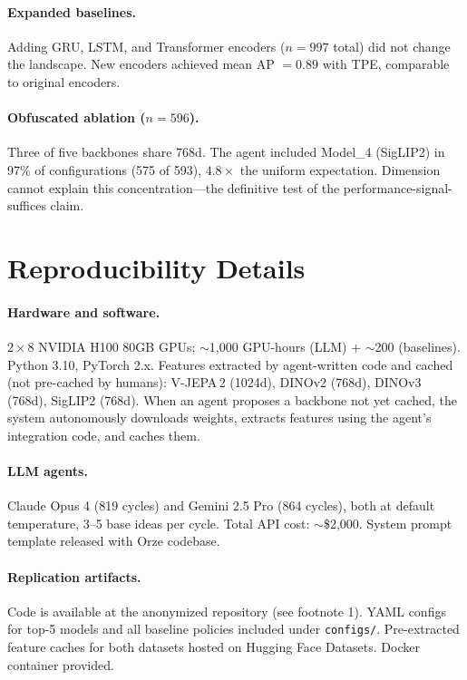 \documentclass{article}
\begin{document}
\paragraph{Expanded baselines.}
Adding GRU, LSTM, and Transformer encoders ($n = 997$ total) did not change the landscape. New encoders achieved mean AP $= 0.89$ with TPE, comparable to original encoders.

\paragraph{Obfuscated ablation ($n = 596$).}
Three of five backbones share 768d. The agent included Model\_4 (SigLIP2) in 97\% of configurations (575 of 593), $4.8\times$ the uniform expectation. Dimension cannot explain this concentration---the definitive test of the performance-signal-suffices claim.


\section{Reproducibility Details}
\label{app:reproducibility}

\paragraph{Hardware and software.}
$2 \times 8$ NVIDIA H100 80GB GPUs; $\sim$1{,}000 GPU-hours (LLM) + $\sim$200 (baselines). Python 3.10, PyTorch 2.x. Features extracted by agent-written code and cached (not pre-cached by humans): V-JEPA\,2 (1024d), DINOv2 (768d), DINOv3 (768d), SigLIP2 (768d). When an agent proposes a backbone not yet cached, the system autonomously downloads weights, extracts features using the agent's integration code, and caches them.

\paragraph{LLM agents.}
Claude Opus 4 (819 cycles) and Gemini 2.5 Pro (864 cycles), both at default temperature, 3--5 base ideas per cycle. Total API cost: $\sim$\$2{,}000. System prompt template released with Orze codebase.

\paragraph{Replication artifacts.}
Code is available at the anonymized repository (see footnote 1). YAML configs for top-5 models and all baseline policies included under \texttt{configs/}. Pre-extracted feature caches for both datasets hosted on Hugging Face Datasets. Docker container provided.
\end{document}
